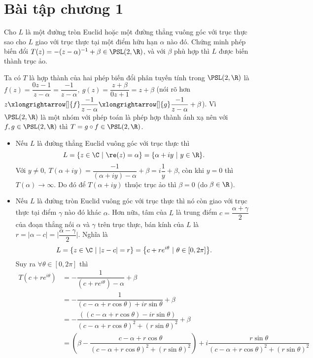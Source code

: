 \section{Bài tập chương 1}
\begin{ex}
    Cho $L$ là một đường tròn Euclid hoặc một đường thẳng vuông góc với trục thực sao cho $L$ giao với trục thực tại một điểm hữu hạn $\alpha$ nào đó. Chứng minh phép biến đổi $T(z)=-(z-\alpha)^{-1}+\beta \in \PSL(2,\R)$, và với $\beta$ phù hợp thì $L$ được biến thành trục ảo.
\end{ex}
\begin{sol*}
Ta có $T$ là hợp thành của hai phép biến đổi phân tuyến tính trong $\PSL(2,\R)$ là $f(z) = \dfrac{0z-1}{z-\alpha} = \dfrac{-1}{z-\alpha},~g(z) = \dfrac{z+\beta}{0z+1}=z+\beta$ \big(nói rõ hơn $z\xlongrightarrow[]{f}\dfrac{-1}{z-\alpha}\xlongrightarrow[]{g}\dfrac{-1}{z-\alpha} + \beta$\big). Vì $\PSL(2,\R)$ là một nhóm với phép toán là phép hợp thành ánh xạ nên với $f,g\in \PSL(2,\R)$ thì $T = g\circ f \in \PSL(2,\R)$.
\begin{itemize}
    \item Nếu $L$ là đường thẳng Euclid vuông góc với trục thực thì 
    \[L = \{z\in \C~|~\re(z) = \alpha\} = \{\alpha + iy ~|~y \in \R\}.\] 
    Với $y\neq 0,~T(\alpha + iy) = \dfrac{-1}{(\alpha + iy)-\alpha} + \beta = i\dfrac{1}{y} + \beta$, còn khi $y=0$ thì $T(\alpha) \to \infty$. Do đó để $T(\alpha + iy)$ thuộc trục ảo thì $\beta = 0$ (do $\beta \in \R$).
    \item Nếu $L$ là đường tròn Euclid vuông góc với trục thực thì nó còn giao với trục thực tại điểm $\gamma$ nào đó khác $\alpha$. Hơn nữa, tâm của $L$ là trung điểm $c = \dfrac{\alpha + \gamma}{2}$ của đoạn thẳng nối $\alpha$ và $\gamma$ trên trục thực, bán kính của $L$ là $r = |\alpha - c| = \bigg|\dfrac{\alpha-\gamma}{2}\bigg|$. Nghĩa là \[L = \{z\in \C~|~|z-c| = r\} = \big\{c+re^{i\theta}~|~\theta \in [0, 2\pi]\big\}.\]
    Suy ra $\forall \theta \in [0,2\pi]$ thì 
    \begin{align*}
        T(c+re^{i\theta}) &= -\dfrac{1}{(c+re^{i\theta})-\alpha} + \beta\\
        & = -\dfrac{1}{(c-\alpha+r\cos{\theta}) + ir\sin{\theta}} + \beta\\
        & = -\dfrac{((c-\alpha+r\cos{\theta}) - ir\sin{\theta})}{(c-\alpha+r\cos{\theta})^2 + (r\sin{\theta})^2} + \beta\\
        &= \left(\beta - \dfrac{c-\alpha+r\cos{\theta}}{(c-\alpha+r\cos{\theta})^2 + (r\sin{\theta})^2}\right) + i\dfrac{r\sin{\theta}}{(c-\alpha+r\cos{\theta})^2 + (r\sin{\theta})^2}

\end{align*}
\end{itemize}
\end{sol*}
